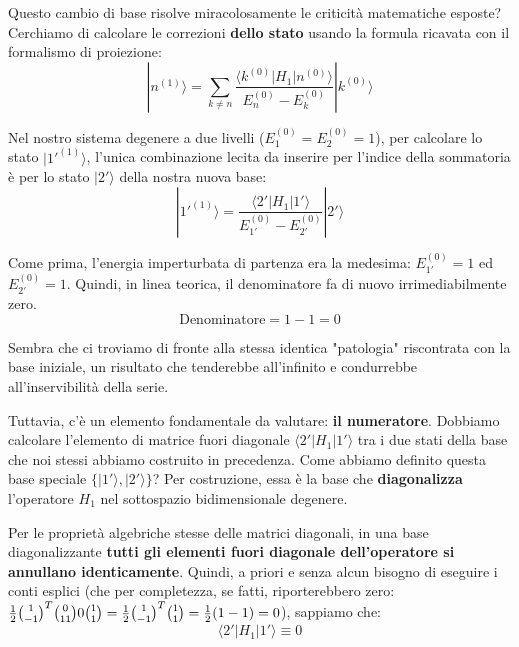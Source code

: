 Questo cambio di base risolve miracolosamente le criticità matematiche esposte? Cerchiamo di calcolare le correzioni \textbf{dello stato} usando la formula ricavata con il formalismo di proiezione:
\begin{equation}
|n^{(1)}\rangle = \sum_{k \neq n} \frac{\langle k^{(0)} | H_1 | n^{(0)} \rangle}{E_n^{(0)} - E_k^{(0)}} |k^{(0)}\rangle
\end{equation}

Nel nostro sistema degenere a due livelli ($E_1^{(0)} = E_2^{(0)} = 1$), per calcolare lo stato $\vert{}1'^{(1)}\rangle$, l'unica combinazione lecita da inserire per l'indice della sommatoria è per lo stato $\vert{}2'\rangle$ della nostra nuova base:
\begin{equation}
|1'^{(1)}\rangle = \frac{\langle 2' | H_1 | 1' \rangle}{E_{1'}^{(0)} - E_{2'}^{(0)}} |2'\rangle
\end{equation}

Come prima, l'energia imperturbata di partenza era la medesima: $E_{1'}^{(0)} = 1$ ed $E_{2'}^{(0)} = 1$. Quindi, in linea teorica, il denominatore fa di nuovo irrimediabilmente zero.
\begin{equation}
\text{Denominatore} = 1 - 1 = 0
\end{equation}

Sembra che ci troviamo di fronte alla stessa identica "patologia" riscontrata con la base iniziale, un risultato che tenderebbe all'infinito e condurrebbe all'inservibilità della serie.

Tuttavia, c'è un elemento fondamentale da valutare: \textbf{il numeratore}. Dobbiamo calcolare l'elemento di matrice fuori diagonale $\langle 2' \vert{} H_1 \vert{} 1' \rangle$ tra i due stati della base che noi stessi abbiamo costruito in precedenza.
Come abbiamo definito questa base speciale $\{ \vert{}1'\rangle, \vert{}2'\rangle \}$? Per costruzione, essa è la base che \textbf{diagonalizza} l'operatore $H_1$ nel sottospazio bidimensionale degenere.

Per le proprietà algebriche stesse delle matrici diagonali, in una base diagonalizzante \textbf{tutti gli elementi fuori diagonale dell'operatore si annullano identicamente}. Quindi, a priori e senza alcun bisogno di eseguire i conti esplici (che per completezza, se fatti, riporterebbero zero: $\frac{1}{2} \binom{1}{-1}^T \binom{0}{1 \\ 1}{0} \binom{1}{1} = \frac{1}{2} \binom{1}{-1}^T \binom{1}{1} = \frac{1}{2}(1 - 1) = 0$), sappiamo che:
\begin{equation}
\langle 2' | H_1 | 1' \rangle \equiv 0
\end{equation}

